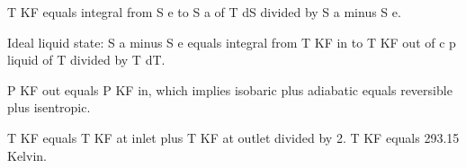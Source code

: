 T KF equals integral from S e to S a of T dS divided by S a minus S e.  

Ideal liquid state:  
S a minus S e equals integral from T KF in to T KF out of c p liquid of T divided by T dT.  

P KF out equals P KF in, which implies isobaric plus adiabatic equals reversible plus isentropic.  

T KF equals T KF at inlet plus T KF at outlet divided by 2.  
T KF equals 293.15 Kelvin.